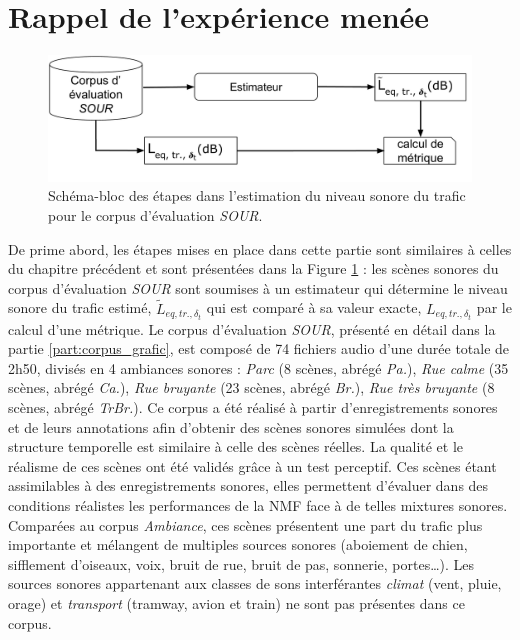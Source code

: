 \section{Rappel de l'expérience menée}\label{part:rappelExp}
 

\begin{figure}[ht]
\centering
\includegraphics[width=0.9\linewidth]{./figures/NMF/Bloc_diagram_estimateur_SOUR.pdf}
\caption{Schéma-bloc des étapes dans l'estimation du niveau sonore du trafic pour le corpus d'évaluation \textit{SOUR}.}
\label{fig:diagram_SOUR}
\end{figure}


De prime abord, les étapes mises en place dans cette partie sont similaires à celles du chapitre précédent et sont présentées dans la Figure \ref{fig:diagram_SOUR} : les scènes sonores du corpus d'évaluation \textit{SOUR} sont soumises à un estimateur qui détermine le niveau sonore du trafic estimé, $\tilde{L}_{eq,tr.,\delta_t}$ qui est comparé à sa valeur exacte, $L_{eq,tr.,\delta_t}$ par le calcul d'une métrique.
Le corpus d'évaluation \textit{SOUR}, présenté en détail dans la partie \ref{part:corpus_grafic}, est composé de 74 fichiers audio d'une durée totale de 2h50, divisés en 4 ambiances sonores : \textit{Parc} (8 scènes, abrégé \textit{Pa.}), \textit{Rue calme} (35 scènes, abrégé \textit{Ca.}), \textit{Rue bruyante} (23 scènes, abrégé \textit{Br.}), \textit{Rue très bruyante} (8 scènes, abrégé \textit{TrBr.}). Ce corpus a été réalisé à partir d'enregistrements sonores et de leurs annotations afin d'obtenir des scènes sonores simulées dont la structure temporelle est similaire à celle des scènes réelles. La qualité et le réalisme de ces scènes ont été validés grâce à un test perceptif. Ces scènes étant assimilables à des enregistrements sonores, elles permettent d'évaluer dans des conditions réalistes les performances de la NMF face à de telles mixtures sonores. Comparées au corpus \textit{Ambiance}, ces scènes présentent une part du trafic plus importante et mélangent de multiples sources sonores (aboiement de chien, sifflement d'oiseaux, voix, bruit de rue, bruit de pas, sonnerie, portes\dots{}). Les sources sonores appartenant aux classes de sons interférantes \textit{climat} (vent, pluie, orage) et \textit{transport} (tramway, avion et train) ne sont pas présentes dans ce corpus.

